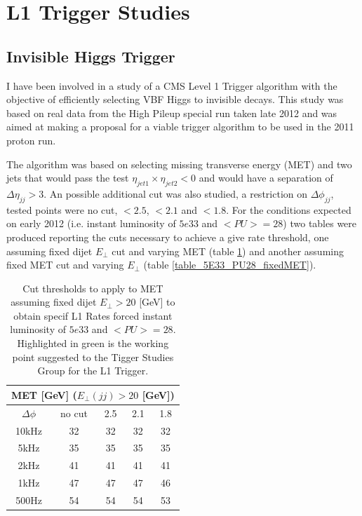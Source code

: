 \documentclass[%
 reprint,
 amsmath,
 amssymb,
 aps,
 pra,
 showkeys
]{revtex4-1}
\begin{document}
\section{L1 Trigger Studies}

\subsection{Invisible Higgs Trigger}

I have been involved in a study of a CMS Level 1 Trigger algorithm with the objective of efficiently selecting
VBF Higgs to invisible decays. This study was based on real data from the High Pileup special run taken late 2012
and was aimed at making a proposal for a viable trigger algorithm to be used in the 2011 proton run.

The algorithm was based on selecting missing transverse energy (MET) and two jets that would pass the test 
$\eta_{jet1}\times\eta_{jet2}<0$ and would have a separation of $\Delta\eta_{jj}>3$. An possible additional cut
was also studied, a restriction on $\Delta\phi_{jj}$, tested points were no cut, $<2.5$, $<2.1$ and $<1.8$. For the
conditions expected on early 2012 (i.e. instant luminosity of $5e33$ and $<PU>=28$) two tables were produced
reporting the cuts necessary to achieve a give rate threshold,
one assuming fixed dijet $E_\bot$ cut and varying MET (table \ref{table_5E33_PU28_fixedDijet}) and another
assuming fixed MET cut and varying $E_\bot$ (table \ref{table_5E33_PU28_fixedMET}). 

\begin{table} 
\begin{tabular}{|c||c|c|c|c|}
\hline
\multicolumn{5}{|c|}{MET [GeV] ($E_\bot(jj)>20$ [GeV])} \\
\hline
$\Delta\phi$ & no cut & 2.5 & 2.1 & 1.8 \\
\hline
10kHz        &     32 &  32 &  32 &  32 \\
5kHz         &     35 &  35 &  35 &  35 \\
\cellcolor{green}2kHz &\cellcolor{green}      41 &  41 &  41 &  41 \\
1kHz         &     47 &  47 &  47 &  46 \\
500Hz        &     54 &  54 &  54 &  53 \\
\hline
\end{tabular}
\caption{Cut thresholds to apply to MET assuming fixed dijet $E_\bot>20$ [GeV] to obtain specif L1 Rates forced
instant luminosity of $5e33$ and $<PU>=28$. Highlighted in green is the working point suggested to the Tigger 
Studies Group for the L1 Trigger.}
\label{table_5E33_PU28_fixedDijet}
\end{table}
\end{document}
